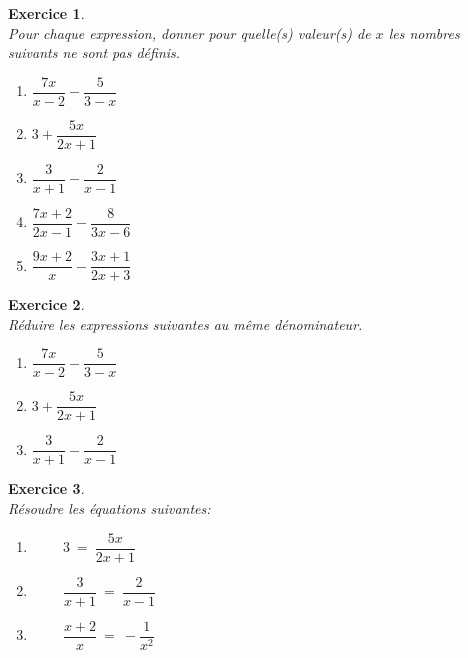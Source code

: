 \documentclass[a4paper,10pt]{article}
\newtheorem{exer}{Exercice}
\begin{document}
\begin{minipage}[t]{1.0\linewidth}
	\begin{minipage}[t]{0.4\linewidth}
		\raggedright
		
			\begin{exer}\hfill\textbf{}\\
			Pour chaque expression, donner pour quelle(s)  valeur(s) de $x$ les nombres suivants ne sont pas définis.  
			
			\begin{enumerate}
				\item $\dfrac{7x}{x-2}-\dfrac{5}{3-x }$ 
				\item $ 3+\dfrac{5x}{2x+1}$
				\item $\dfrac{3}{x+1} - \dfrac{2}{x-1}$
				\item $\dfrac{7x+2}{2x-1}- \dfrac{8}{3x-6}$
				\item $\dfrac{9x+2}{x} - \dfrac{3x+1}{2x+3}$
			\end{enumerate}
			
		\end{exer}
	

	\end{minipage}
	\hfill\vrule\hfill
	\begin{minipage}[t]{0.4\linewidth}
		\raggedright
			\begin{exer}\hfill\textbf{}\\
				Réduire les expressions suivantes au même dénominateur.
				
					\begin{enumerate}
						\item $\dfrac{7x}{x-2}-\dfrac{5}{3-x } $
						\item $ 3+\dfrac{5x}{2x+1}$
						\item $\dfrac{3}{x+1} - \dfrac{2}{x-1}$
					
					\end{enumerate}
			\end{exer}
		\begin{exer}\hfill\textbf{}\\
		Résoudre les équations suivantes:\\[3mm]
		\begin{enumerate}
			
			\item $ \quad\quad~3 \ = \ \dfrac{5x}{2x+1}$\\
			
			
			
			\item $\quad\quad~\dfrac{3}{x+1} \ = \  \dfrac{2}{x-1}$\\
			
			\item $\quad\quad~\dfrac{x+2}{x} \ = \  - \dfrac{1}{x^2}$\\
			
			
			
			
		\end{enumerate}
		\end{exer}
	\end{minipage}
\end{minipage}
\end{document}
